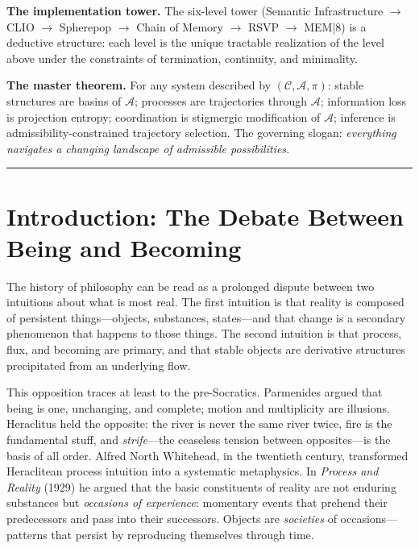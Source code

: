 \documentclass[12pt, a4paper, twoside]{article}
\theoremstyle{plain}
\theoremstyle{definition}
\theoremstyle{remark}
\begin{document}
\medskip
\noindent\textbf{The implementation tower.}
The six-level tower (Semantic Infrastructure $\to$ CLIO $\to$ Spherepop $\to$
Chain of Memory $\to$ RSVP $\to$ MEM|8) is a deductive structure: each level
is the unique tractable realization of the level above under the constraints
of termination, continuity, and minimality.

\medskip
\noindent\textbf{The master theorem.}
For any system described by $(\mathcal{C}, \mathcal{A}, \pi)$: stable
structures are basins of $\mathcal{A}$; processes are trajectories through
$\mathcal{A}$; information loss is projection entropy; coordination is
stigmergic modification of $\mathcal{A}$; inference is admissibility-constrained
trajectory selection. The governing slogan: \emph{everything navigates a
changing landscape of admissible possibilities.}

\bigskip
\begin{center}
  \rule{0.35\textwidth}{0.4pt}
\end{center}

\tableofcontents
\newpage

\section{Introduction: The Debate Between Being and Becoming}
\label{sec:intro}

The history of philosophy can be read as a prolonged dispute between two
intuitions about what is most real. The first intuition is that reality is
composed of persistent things---objects, substances, states---and that change
is a secondary phenomenon that happens to those things. The second intuition
is that process, flux, and becoming are primary, and that stable objects are
derivative structures precipitated from an underlying flow.

This opposition traces at least to the pre-Socratics. Parmenides argued that
being is one, unchanging, and complete; motion and multiplicity are illusions.
Heraclitus held the opposite: the river is never the same river twice, fire is
the fundamental stuff, and \emph{strife}---the ceaseless tension between
opposites---is the basis of all order. Alfred North Whitehead, in the twentieth
century, transformed Heraclitean process intuition into a systematic metaphysics.
In \emph{Process and Reality} (1929) he argued that the basic constituents of
reality are not enduring substances but \emph{occasions of experience}: momentary
events that prehend their predecessors and pass into their successors. Objects
are \emph{societies} of occasions---patterns that persist by reproducing
themselves through time.
\end{document}
